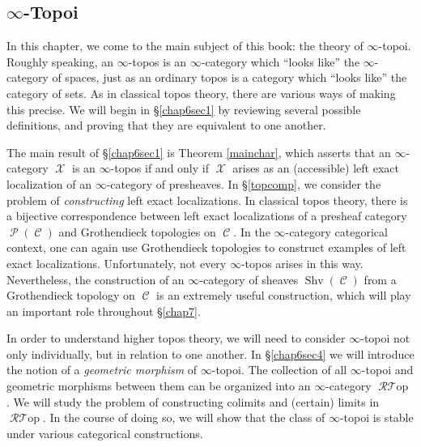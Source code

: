 \documentclass{report}[10pt, final]
\DeclareMathOperator{\Shv}{Shv}
\DeclareMathOperator{\RGeom}{\mathcal{R}{\mathcal T}op}
\DeclareMathOperator{\calC}{\mathcal{C}}
\DeclareMathOperator{\calX}{\mathcal{X}}
\DeclareMathOperator{\calP}{\mathcal{P}}
\theoremstyle{definition}
\begin{document}
\begin{Didn't Read}






\chapter{$\infty$-Topoi}\label{chap6}

\setcounter{theorem}{0}
\setcounter{subsection}{0}

In this chapter, we come to the main subject of this book: the theory of $\infty$-topoi.
Roughly speaking, an $\infty$-topos is an $\infty$-category which ``looks like'' the $\infty$-category of spaces, just as an ordinary topos is a category which ``looks like'' the category of sets. As in classical topos theory, there are various ways of making this precise. We will begin in \S \ref{chap6sec1} by reviewing several possible definitions, and proving that they are equivalent to one another.

The main result of \S \ref{chap6sec1} is Theorem \ref{mainchar}, which asserts that an $\infty$-category $\calX$ is an $\infty$-topos if and only if $\calX$ arises as an (accessible) left exact localization of an $\infty$-category of presheaves. In \S \ref{topcomp}, we consider the problem of {\em constructing} left exact localizations. In classical topos theory, there is a bijective correspondence between left exact localizations of a presheaf category $\calP(\calC)$ and Grothendieck topologies on $\calC$. In the $\infty$-category categorical context, one can again use Grothendieck topologies to construct examples of left exact localizations. 
Unfortunately, not every $\infty$-topos arises in this way. Nevertheless, the construction of an $\infty$-category of sheaves $\Shv(\calC)$ from a Grothendieck topology on $\calC$ is an extremely useful construction, which will play an important role throughout \S \ref{chap7}.

In order to understand higher topos theory, we will need to consider $\infty$-topoi not only individually, but in relation to one another. In \S \ref{chap6sec4} we will introduce the notion of a {\em geometric morphism} of $\infty$-topoi. The collection of all $\infty$-topoi and geometric morphisms between them can be organized into an $\infty$-category $\RGeom$. We will study the problem of constructing colimits and (certain) limits in $\RGeom$. In the course of doing so, we will show that the class of $\infty$-topoi is stable under various categorical constructions.


\end{Didn't Read}
\end{document}
